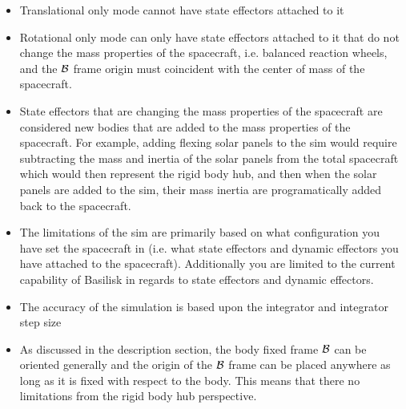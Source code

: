 \begin{itemize}
	\item Translational only mode cannot have state effectors attached to it
	\item Rotational only mode can only have state effectors attached to it that do not change the mass properties of the spacecraft, i.e. balanced reaction wheels, and the $\cal{B}$ frame origin must coincident with the center of mass of the spacecraft. 
	\item State effectors that are changing the mass properties of the spacecraft are considered new bodies that are added to the mass properties of the spacecraft. For example, adding flexing solar panels to the sim would require subtracting the mass and inertia of the solar panels from the total spacecraft which would then represent the rigid body hub, and then when the solar panels are added to the sim, their mass inertia are programatically added back to the spacecraft.
	\item The limitations of the sim are primarily based on what configuration you have set the spacecraft in (i.e. what state effectors and dynamic effectors you have attached to the spacecraft). Additionally you are limited to the current capability of Basilisk in regards to state effectors and dynamic effectors. 
	\item The accuracy of the simulation is based upon the integrator and integrator step size
	\item As discussed in the description section, the body fixed frame $\cal{B}$ can be oriented generally and the origin of the $\cal{B}$ frame can be placed anywhere as long as it is fixed with respect to the body. This means that there no limitations from the rigid body hub perspective. 
\end{itemize}